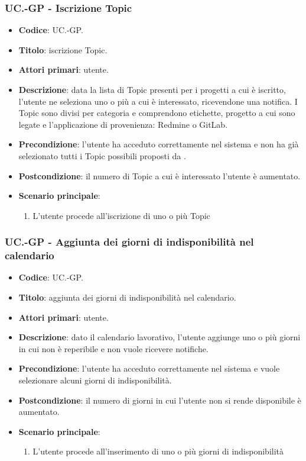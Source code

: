	\subsubsection{UC\theuccount.\thesubuccount-GP - Iscrizione Topic}

		\begin{itemize}
			\item \textbf{Codice}: UC\theuccount.\thesubuccount-GP.
			\item \textbf{Titolo}: iscrizione Topic.
			\item \textbf{Attori primari}: utente.
			\item \textbf{Descrizione}: data la lista di Topic presenti per i progetti a cui è iscritto, l’utente ne seleziona uno o	più a cui è interessato, ricevendone una notifica. I Topic sono divisi per categoria e	comprendono etichette, progetto a cui sono legate e l'applicazione di provenienza: Redmine o GitLab.
			\item \textbf{Precondizione}: l’utente ha acceduto correttamente nel sistema e non ha già selezionato tutti i Topic possibili proposti da \progetto.
			\item \textbf{Postcondizione}: il numero di Topic a cui è interessato l’utente è aumentato.
			\item \textbf{Scenario principale}:
			\begin{enumerate}
				\item L'utente procede all'iscrizione di uno o più Topic
			\end{enumerate}
		\end{itemize}

	\subsubsection{UC\theuccount.\thesubuccount-GP - Aggiunta dei giorni di indisponibilità nel calendario}

		\begin{itemize}
			\item \textbf{Codice}: UC\theuccount.\thesubuccount-GP.
			\item \textbf{Titolo}: aggiunta dei giorni di indisponibilità nel calendario.
			\item \textbf{Attori primari}: utente.
			\item \textbf{Descrizione}: dato il calendario lavorativo, l’utente aggiunge uno o più giorni in cui non è reperibile e non vuole ricevere notifiche.
			\item \textbf{Precondizione}: l’utente ha acceduto correttamente nel sistema e vuole selezionare alcuni giorni di indisponibilità.
			\item \textbf{Postcondizione}: il numero di giorni in cui l’utente non si rende disponibile è aumentato.
			\item \textbf{Scenario principale}:
			\begin{enumerate}
				\item L'utente procede all'inserimento di uno o più giorni di indisponibilità
			\end{enumerate}
		\end{itemize}

